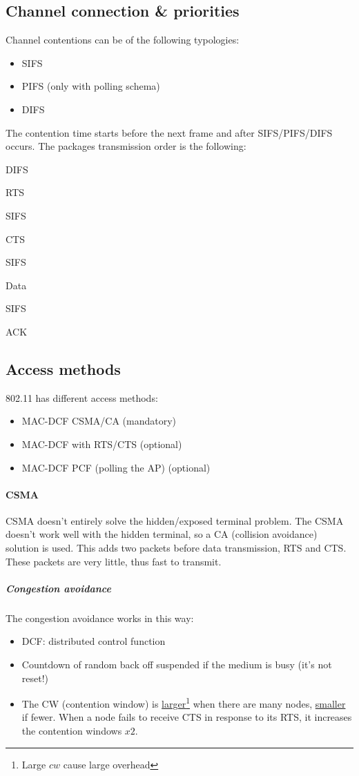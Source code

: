\subsection{Channel connection \& priorities}
Channel contentions can be of the following typologies:
\begin{itemize}
\item SIFS
\item PIFS (only with polling schema)
\item DIFS
\end{itemize}

The contention time starts before the next frame and after SIFS/PIFS/DIFS
occurs.
The packages transmission order is the following:
\begin{AutoMultiColEnumerate}
\item DIFS
\item RTS
\item SIFS
\item CTS
\item SIFS
\item Data
\item SIFS
\item ACK
\end{AutoMultiColEnumerate}

\subsection{Access methods}
802.11 has different access methods:
\begin{itemize}
\item MAC-DCF CSMA/CA (mandatory)
\item MAC-DCF with RTS/CTS (optional)
\item MAC-DCF PCF (polling the AP) (optional)
\end{itemize}

\paragraph*{CSMA} CSMA doesn't entirely solve the hidden/exposed terminal
problem. The CSMA doesn't work well with the hidden terminal, so a CA
(collision avoidance) solution is used. This adds two packets before data
transmission, RTS and CTS. These packets are very little, thus fast to transmit.

\subparagraph*{Congestion avoidance} The congestion avoidance works in this way:
\begin{itemize}
\item DCF: distributed control function
\item Countdown of random back off suspended if the medium is busy (it's not
  reset!)
\item The CW (contention window) is \underline{larger}\footnote{Large $cw$ cause
  large overhead} when there are many nodes, \underline{smaller} if fewer. When
  a node fails to receive CTS in response to its RTS, it increases the
  contention windows $x2$.
\end{itemize}

